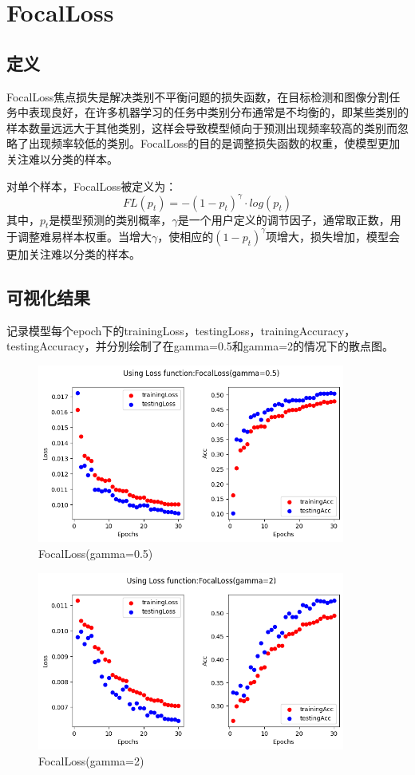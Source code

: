 \documentclass{article}
\begin{document}
\section{FocalLoss}

\subsection{定义}
FocalLoss焦点损失是解决类别不平衡问题的损失函数，在目标检测和图像分割任务中表现良好，在许多机器学习的任务中类别分布通常是不均衡的，即某些类别的样本数量远远大于其他类别，这样会导致模型倾向于预测出现频率较高的类别而忽略了出现频率较低的类别。FocalLoss的目的是调整损失函数的权重，使模型更加关注难以分类的样本。

对单个样本，FocalLoss被定义为：
$$
FL(p_t)=-(1-p_t)^\gamma·log(p_t)
$$
其中，$p_t$是模型预测的类别概率，$\gamma$是一个用户定义的调节因子，通常取正数，用于调整难易样本权重。当增大$\gamma$，使相应的$(1-p_t)^\gamma$项增大，损失增加，模型会更加关注难以分类的样本。

\subsection{可视化结果}

记录模型每个epoch下的trainingLoss，testingLoss，trainingAccuracy，testingAccuracy，并分别绘制了在gamma=0.5和gamma=2的情况下的散点图。
\begin{figure}[H]
    \centering
    \includegraphics[width=0.9\textwidth]{Figure/FocalLoss(gamma=0.5).png}
    \caption{FocalLoss(gamma=0.5)}
    \label{fig:FocalLoss(gamma=0.5)}
\end{figure}

\begin{figure}[H]
    \centering
    \includegraphics[width=0.9\textwidth]{Figure/FocalLoss(gamma=2).png}
    \caption{FocalLoss(gamma=2)}
    \label{fig:FocalLoss(gamma=2)}
\end{figure}
\end{document}
